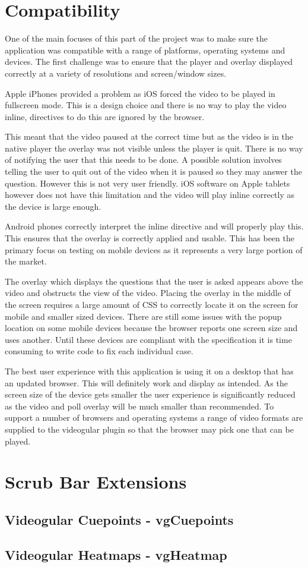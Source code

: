 \section{Compatibility} 
\label{Section:Compatibility}

One of the main focuses of this part of the project was to make sure the application was compatible with a range of platforms, operating systems and devices. The first challenge was to ensure that the player and overlay displayed correctly at a variety of resolutions and screen/window sizes. 

Apple iPhones provided a problem as iOS forced the video to be played in fullscreen mode. This is a design choice and there is no way to play the video inline, directives to do this are ignored by the browser.

This meant that the video paused at the correct time but as the video is in the native player the overlay was not visible unless the player is quit. There is no way of notifying the user that this needs to be done. A possible solution involves telling the user to quit out of the video when it is paused so they may answer the question. However this is not very user friendly. iOS software on Apple tablets however does not have this limitation and the video will play inline correctly as the device is large enough.

Android phones correctly interpret the inline directive and will properly play this. This ensures that the overlay is correctly applied and usable. This has been the primary focus on testing on mobile devices as it represents a very large portion of the market.

The overlay which displays the questions that the user is asked appears above the video and obstructs the view of the video. Placing the overlay in the middle of the screen requires a large amount of CSS to correctly locate it on the screen for mobile and smaller sized devices. There are still some issues with the popup location on some mobile devices because the browser reports one screen size and uses another. Until these devices are compliant with the specification it is time consuming to write code to fix each individual case.

The best user experience with this application is using it on a desktop that has an updated browser. This will definitely work and display as intended. As the screen size of the device gets smaller the user experience is significantly reduced as the video and poll overlay will be much smaller than recommended. To support a number of browsers and operating systems a range of video formats are supplied to the videogular plugin so that the browser may pick one that can be played.

\section{Scrub Bar Extensions} 
\label{Section:Scrub Bar Extensions}

\subsection{Videogular Cuepoints - vgCuepoints}

\subsection{Videogular Heatmaps - vgHeatmap}